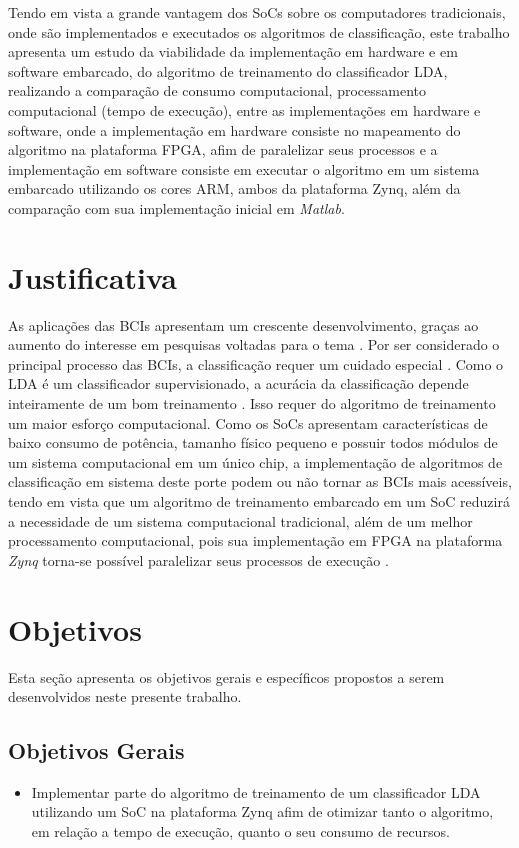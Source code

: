 Tendo em vista a grande vantagem dos SoCs sobre os computadores tradicionais, onde são implementados e executados os algoritmos de classificação, este trabalho apresenta um estudo da viabilidade da implementação em hardware e em software embarcado, do algoritmo de treinamento do classificador LDA, realizando a comparação de consumo computacional, processamento computacional (tempo de execução), entre as implementações em hardware e software, onde a implementação em hardware consiste no mapeamento do algoritmo na plataforma FPGA, afim de paralelizar seus processos e a implementação em software consiste em executar o algoritmo em um sistema embarcado utilizando os cores ARM, ambos da plataforma Zynq, além da comparação com sua implementação inicial em \textit{Matlab}.


\section{Justificativa}
As aplicações das BCIs apresentam um crescente desenvolvimento, graças ao aumento do interesse em pesquisas voltadas para o tema \cite{BCICompetition}. Por ser considerado o principal processo das BCIs, a classificação requer um cuidado especial \cite{MasonAndBirch}. Como o LDA é um classificador supervisionado, a acurácia da classificação depende inteiramente de um bom treinamento \cite{F.Lotte}. Isso requer do algoritmo de treinamento um maior esforço computacional. Como os SoCs apresentam características de baixo consumo de potência, tamanho físico pequeno e possuir todos módulos de um sistema computacional em um único chip, a implementação de algoritmos de classificação em sistema deste porte podem ou não tornar as BCIs mais acessíveis, tendo em vista que um algoritmo de treinamento embarcado em um SoC reduzirá a necessidade de um sistema computacional tradicional, além de um melhor processamento computacional, pois sua implementação em FPGA na plataforma \textit{Zynq} torna-se possível paralelizar seus processos de execução \cite{zynqBook}.

\section{Objetivos}
Esta seção apresenta os objetivos gerais e específicos propostos a serem desenvolvidos neste
 presente trabalho.
\subsection{Objetivos Gerais}
\begin{itemize}
	\item Implementar parte do algoritmo de treinamento de um classificador LDA utilizando um SoC na plataforma Zynq afim de otimizar tanto o algoritmo, em relação a tempo de execução, quanto o seu consumo de recursos.
\end{itemize} 
